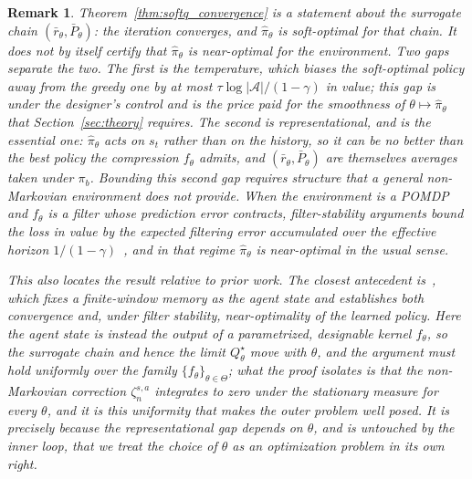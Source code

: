 \documentclass[12pt]{article}
\renewcommand{\[}{\left[}
\renewcommand{\]}{\right]}
\renewcommand{\(}{\left(}
\renewcommand{\)}{\right)}
\newcounter{l1}
\newcounter{l2}
\newcounter{l3}
\newtheorem{remark}{Remark}
\begin{document}
\begin{remark}\label{rem:nearopt}
Theorem~\ref{thm:softq_convergence} is a statement about the surrogate chain
$(\bar{r}_\theta, \bar{P}_\theta)$: the iteration converges, and $\widehat{\pi}_\theta$ is
soft-optimal for that chain. It does not by itself certify that $\widehat{\pi}_\theta$ is
near-optimal for the environment. Two gaps separate the
two. The first is the temperature, which biases the soft-optimal policy away from the
greedy one by at most $\tau\log|\mathcal{A}|/(1-\gamma)$ in value; this gap is under the
designer's control and is the price paid for the smoothness of
$\theta \mapsto \widehat{\pi}_\theta$ that Section~\ref{sec:theory} requires. The second is
representational, and is the essential one: $\widehat{\pi}_\theta$ acts on $s_t$ rather than
on the history, so it can be no better than the best policy the compression $f_\theta$
admits, and $(\bar{r}_\theta,\bar{P}_\theta)$ are themselves averages taken under $\pi_b$.
Bounding this second gap requires structure that a general non-Markovian environment does
not provide. When the environment is a POMDP and $f_\theta$ is a filter whose prediction
error contracts, filter-stability arguments bound the loss in value by the expected
filtering error accumulated over the effective horizon
$1/(1-\gamma)$~\cite{kara2023convergence, subramanian2022approximate}, and in that regime
$\widehat{\pi}_\theta$ is near-optimal in the usual sense.

This also locates the result relative to prior work. The closest antecedent
is~\cite{kara2023convergence}, which fixes a finite-window memory as the agent state and
establishes both convergence and, under filter stability, near-optimality of the learned
policy. Here the agent state is instead the output of a parametrized, \emph{designable}
kernel $f_\theta$, so the surrogate chain and hence the limit $Q^\star_\theta$ move with
$\theta$, and the argument must hold uniformly over the family
$\{f_\theta\}_{\theta\in\Theta}$; what the proof isolates is that the non-Markovian
correction $\zeta^{s,a}_n$ integrates to zero under the stationary measure for
\emph{every} $\theta$, and it is this uniformity that makes the outer problem well posed.
It is precisely because the representational gap depends on $\theta$, and is untouched by
the inner loop, that we treat the choice of $\theta$ as an optimization problem in its own
right.
\end{remark}
\end{document}
